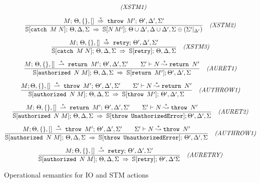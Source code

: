 \begin{figure*}
{\begin{minipage}{\textwidth}
\begin{gather*}
    \quad\soslbl{XSTM1}
\\[5pt]
\sos{M;\,\Theta,\emptyset\new{,[]}
     \stackrel{*}{\tdarrow}
     \prg{throw }M';\, \Theta', \Delta'\new{, \Sigma'}}
    {\SS[\prg{catch }M\;N];\,\Theta,\Delta\new{,\Sigma} \tdarrow
     \SS[N \,M'];\, \Theta\cup\Delta',\Delta\cup\Delta'\new{,\Sigma\oplus(\Sigma'|_{\Delta'})}}
    \quad\soslbl{XSTM2}
\\[5pt]
\sos{M;\,\Theta,\emptyset\new{,[]}
     \stackrel{*}{\tdarrow}
     \prg{retry};\, \Theta', \Delta'\new{, \Sigma'}}
    {\SS[\prg{catch }M\;N];\,\Theta,\Delta\new{,\Sigma} \tdarrow
     \SS[\prg{retry}];\, \Theta,\Delta\new{,\Sigma}}
    \quad\soslbl{XSTM3}
\\[5pt]
%
\new{
\sos{M;\,\Theta,\emptyset,[]
     \stackrel{*}{\tddarrow}
     \prg{return }M';\, \Theta',\Delta',\Sigma'
   \qquad
   \Sigma' \vdash N \stackrel{*}{\leadsto} \prg{return }N' }
   {\SS[\prg{authorized }N\;M];\,\Theta,\Delta,\Sigma \tdarrow
    \SS[\prg{return }M'];\Theta',\Delta',\Sigma}
  \quad\soslbl{AURET1}
}
\\[5pt]
\new{
\sos{M;\Theta,\emptyset,[]
     \stackrel{*}{\tddarrow}
     \prg{throw }M';\, \Theta',\Delta',\Sigma'
   \qquad
   \Sigma' \vdash N \stackrel{*}{\leadsto} \prg{return }N' }
   {\SS[\prg{authorized }N\;M];\,\Theta,\Delta,\Sigma \tdarrow
    \SS[\prg{throw }M'];\,\Theta',\Delta',\Sigma}
  \quad\soslbl{AUTHROW1}
}
\\[5pt]
\new{
\sos{M;\,\Theta,\emptyset,[]
     \stackrel{*}{\tddarrow}
     \prg{return }M';\, \Theta',\Delta',\Sigma'
   \qquad
   \Sigma' \vdash N \stackrel{*}{\leadsto} \prg{throw }N' }
   {\SS[\prg{authorized }N\;M];\,\Theta,\Delta,\Sigma \tdarrow
    \SS[\prg{throw UnathorizedError}];\Theta',\Delta',\Sigma}
  \quad\soslbl{AURET2}
}
\\[5pt]
\new{
\sos{M;\Theta,\emptyset,[]
     \stackrel{*}{\tddarrow}
     \prg{throw }M';\, \Theta',\Delta',\Sigma'
   \qquad
   \Sigma' \vdash N \stackrel{*}{\leadsto} \prg{throw }N' }
   {\SS[\prg{authorized }N\;M];\,\Theta,\Delta,\Sigma \tdarrow
    \SS[\prg{throw UnauthorizedError}];\,\Theta',\Delta',\Sigma}
  \quad\soslbl{AUTHROW1}
}
\\[5pt]
\new{
\sos{M;\Theta,\emptyset,[]
     \stackrel{*}{\tddarrow}
     \prg{retry};\, \Theta',\Delta',\Sigma'
   }
   {\SS[\prg{authorized }N\;M];\,\Theta,\Delta,\Sigma \tdarrow
    \SS[\prg{retry}];\,\Theta',\Delta'\Sigma}
  \quad\soslbl{AURETRY}
}
%
\end{gather*}

\end{minipage}}
\caption{Operational semantics for IO and STM actions}
\label{fig:sos1}
\end{figure*}

